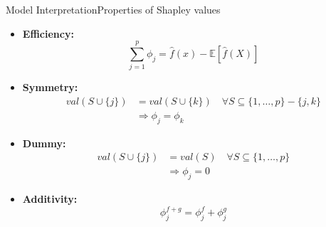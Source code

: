 \documentclass{beamer}
\begin{document}
        \begin{frame}{Model Interpretation}{Properties of Shapley values}

            \begin{itemize}
                \item \textbf{Efficiency:}\begin{equation*}
                    \sum_{j=1}^{p} \phi_j = \hat{f}(x) - \mathbb{E}[\hat{f}(X)]
                \end{equation*}
                \item \textbf{Symmetry:} \begin{equation*}
                    \begin{split}
                        val(S \cup \{j\}) & = val(S \cup \{k\}) \quad \forall S \subseteq \{1, \dots, p\} - \{j, k\} \\
                        & \Rightarrow \phi_j = \phi_k
                    \end{split}
                \end{equation*}
                \item \textbf{Dummy:}  \begin{equation*}
                    \begin{split}
                        val(S \cup \{j\}) & = val(S) \quad \forall S \subseteq \{1, \dots, p\} \\
                        & \Rightarrow \phi_j = 0
                    \end{split}
                \end{equation*}
                \item \textbf{Additivity:} \begin{equation*}
                    \phi_j^{f + g} = \phi_j^{f} + \phi_j^{g}
                \end{equation*}
            \end{itemize}
        \end{frame}
\end{document}
